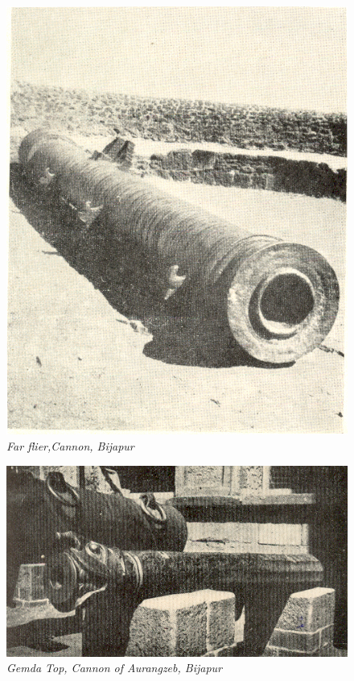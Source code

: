 \begin{figure}[H]
\includegraphics[scale=.7]{images/chapter-5/Fig33.jpg}
\caption{\textit{Far flier,Cannon, Bijapur}}\label{chapter-5-fig33}
\end{figure}

\newpage

\begin{figure}[H]
\includegraphics[scale=.65]{images/chapter-5/Fig34.jpg}
\caption{\textit{Gemda Top, Cannon of Aurangzeb, Bijapur}}\label{chapter-5-fig34}
\end{figure}

